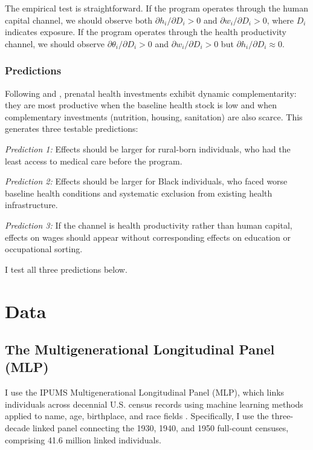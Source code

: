 \documentclass[12pt]{article}
\begin{document}
The empirical test is straightforward. If the program operates through the human capital channel, we should observe both $\partial h_i / \partial D_i > 0$ and $\partial w_i / \partial D_i > 0$, where $D_i$ indicates exposure. If the program operates through the health productivity channel, we should observe $\partial \theta_i / \partial D_i > 0$ and $\partial w_i / \partial D_i > 0$ but $\partial h_i / \partial D_i \approx 0$.

\subsubsection*{Predictions} Following \citet{cunhaheckman2007} and \citet{almondetal2018}, prenatal health investments exhibit dynamic complementarity: they are most productive when the baseline health stock is low and when complementary investments (nutrition, housing, sanitation) are also scarce. This generates three testable predictions:

\textit{Prediction 1:} Effects should be larger for rural-born individuals, who had the least access to medical care before the program.

\textit{Prediction 2:} Effects should be larger for Black individuals, who faced worse baseline health conditions and systematic exclusion from existing health infrastructure.

\textit{Prediction 3:} If the channel is health productivity rather than human capital, effects on wages should appear without corresponding effects on education or occupational sorting.

I test all three predictions below.


\section{Data}

\subsection{The Multigenerational Longitudinal Panel (MLP)}

I use the IPUMS Multigenerational Longitudinal Panel (MLP), which links individuals across decennial U.S. census records using machine learning methods applied to name, age, birthplace, and race fields \citep{feigenbaum2016, abramitzkyboustan2017}. Specifically, I use the three-decade linked panel connecting the 1930, 1940, and 1950 full-count censuses, comprising 41.6 million linked individuals.
\end{document}
